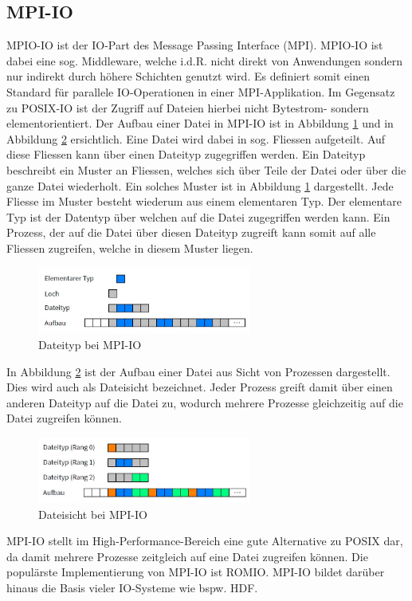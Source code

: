 \subsection{MPI-IO}
MPIO-IO ist der IO-Part des Message Passing Interface (MPI). MPIO-IO ist dabei eine sog. Middleware, welche i.d.R. nicht direkt von Anwendungen sondern nur indirekt durch h\"ohere Schichten genutzt wird. Es definiert somit einen Standard f\"ur parallele IO-Operationen in einer MPI-Applikation. Im Gegensatz zu POSIX-IO ist der Zugriff auf Dateien hierbei nicht Bytestrom- sondern elementorientiert. Der Aufbau einer Datei in MPI-IO ist in Abbildung \ref{fig:dateityp} und in Abbildung \ref{fig:dateisicht} ersichtlich. Eine Datei wird dabei in sog. Fliessen aufgeteilt. Auf diese Fliessen kann \"uber einen Dateityp zugegriffen werden. Ein Dateityp beschreibt ein Muster an Fliessen, welches sich \"uber Teile der Datei oder \"uber die ganze Datei wiederholt. Ein solches Muster ist in Abbildung \ref{fig:dateityp} dargestellt. Jede Fliesse im Muster besteht wiederum aus einem elementaren Typ. Der elementare Typ ist der Datentyp \"uber welchen auf die Datei zugegriffen werden kann. Ein Prozess, der auf die Datei \"uber diesen Dateityp zugreift kann somit auf alle Fliessen zugreifen, welche in diesem Muster liegen.


\begin{figure}[h]
	\centering
	\includegraphics[width=7cm]{fig/Dateityp.JPG}
	\caption{Dateityp bei MPI-IO \cite{Kuhn.13.05.2016}}
	\label{fig:dateityp}
\end{figure}

In Abbildung \ref{fig:dateisicht} ist der Aufbau einer Datei aus Sicht von Prozessen dargestellt. Dies wird auch als Dateisicht bezeichnet. Jeder Prozess greift damit \"uber einen anderen Dateityp auf die Datei zu, wodurch mehrere Prozesse gleichzeitig auf die Datei zugreifen k\"onnen. 

\begin{figure}[h]
	\centering
	\includegraphics[width=7cm]{fig/Dateisicht.JPG}
	\caption{Dateisicht bei MPI-IO \cite{Kuhn.13.05.2016}}
	\label{fig:dateisicht}
\end{figure}
MPI-IO stellt im High-Performance-Bereich eine gute Alternative zu POSIX dar, da damit mehrere Prozesse zeitgleich auf eine Datei zugreifen k\"onnen. Die popul\"arste Implementierung von MPI-IO ist ROMIO. MPI-IO bildet dar\"uber hinaus die Basis vieler IO-Systeme wie bspw. HDF.\cite{Corbett.1995}\cite{Kuhn.13.05.2016}

